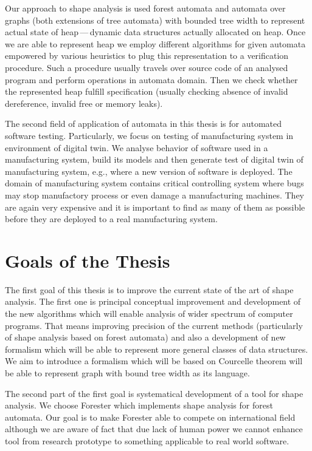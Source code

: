 Our approach to shape analysis is used forest automata and automata over graphs
(both extensions of tree automata) with bounded tree width to represent
actual state of heap\,---\,dynamic data structures actually allocated on heap.
Once we are able to represent heap we employ different algorithms for given automata empowered by
various heuristics to plug this representation to a verification procedure.
Such a procedure usually travels over source code of an analysed program and perform
operations in automata domain.
Then we check whether the represented heap fulfill specification (usually checking
absence of invalid dereference, invalid free or memory leaks).

The second field of application of automata in this thesis is for automated software testing.
Particularly, we focus on testing of manufacturing system in environment of digital twin.
We analyse behavior of software used in a manufacturing system, build its models and then
generate test of digital twin of manufacturing system, e.g., where a new version of software
is deployed.
The domain of manufacturing system contains critical controlling system where bugs may stop
manufactory process or even damage a manufacturing machines.
They are again very expensive and it is important to find as many of them as possible
before they are deployed to a real manufacturing system.

\section{Goals of the Thesis}
The first goal of this thesis is to improve the current state of the art of shape analysis.
The first one is principal conceptual improvement and development of the new algorithms
which will enable analysis of wider spectrum of computer programs.
That means improving precision of the current methods (particularly of shape analysis based on forest automata)
and also a development of new formalism which will be able to represent
more general classes of data structures.
We aim to introduce a formalism which will be based on Courcelle theorem \cite{Courcelle}
will be able to represent graph with bound tree width as its language.

The second part of the first goal is systematical development of a tool for shape analysis.
We choose Forester \cite{svcompweb} which implements shape analysis for forest automata.
Our goal is to make Forester able to compete on international field although we are
aware of fact that due lack of human power we cannot enhance tool from research prototype
to something applicable to real world software.

